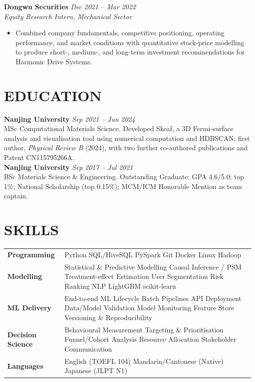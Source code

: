 \documentclass[a4paper,10pt]{article}
\begin{document}
\vspace{0.5pt}
\textbf{Dongwu Securities} \hfill \textit{Dec 2021 -- Mar 2022}\\
\textit{Equity Research Intern, Mechanical Sector}
\begin{itemize}
\item Combined company fundamentals, competitive positioning, operating performance, and market conditions with quantitative stock-price modelling to produce short-, medium-, and long-term investment recommendations for Harmonic Drive Systems.
\end{itemize}

\section{EDUCATION}
\textbf{Nanjing University} \hfill \textit{Sep 2021 -- Jun 2024}\\
MSc Computational Materials Science. Developed Skeaf, a 3D Fermi-surface analysis and visualisation tool using numerical computation and HDBSCAN; first author, \textit{Physical Review B} (2024), with two further co-authored publications and Patent CN115795266A.\\[1pt]
\textbf{Nanjing University} \hfill \textit{Sep 2017 -- Jul 2021}\\
BSc Materials Science \& Engineering. Outstanding Graduate; GPA 4.6/5.0; top 1\%; National Scholarship (top 0.15\%); MCM/ICM Honorable Mention as team captain.

\section{SKILLS}
\begin{tabular}{@{}p{2.90cm}p{14.35cm}@{}}
\textbf{Programming} & Python \textperiodcentered{} SQL/HiveSQL \textperiodcentered{} PySpark \textperiodcentered{} Git \textperiodcentered{} Docker \textperiodcentered{} Linux \textperiodcentered{} Hadoop \\[0.5pt]
\textbf{Modelling} & Statistical \& Predictive Modelling \textperiodcentered{} Causal Inference / PSM \textperiodcentered{} Treatment-effect Estimation \textperiodcentered{} User Segmentation \textperiodcentered{} Risk Ranking \textperiodcentered{} NLP \textperiodcentered{} LightGBM \textperiodcentered{} scikit-learn \\[0.5pt]
\textbf{ML Delivery} & End-to-end ML Lifecycle \textperiodcentered{} Batch Pipelines \textperiodcentered{} API Deployment \textperiodcentered{} Data/Model Validation \textperiodcentered{} Model Monitoring \textperiodcentered{} Feature Store \textperiodcentered{} Versioning \& Reproducibility \\[0.5pt]
\textbf{Decision Science} & Behavioural Measurement \textperiodcentered{} Targeting \& Prioritisation \textperiodcentered{} Funnel/Cohort Analysis \textperiodcentered{} Resource Allocation \textperiodcentered{} Stakeholder Communication \\[0.5pt]
\textbf{Languages} & English (TOEFL 104) \textperiodcentered{} Mandarin/Cantonese (Native) \textperiodcentered{} Japanese (JLPT N1) \\
\end{tabular}
\end{document}
